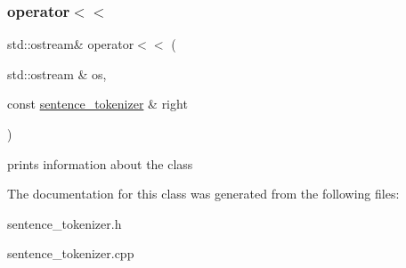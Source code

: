\subsubsection{\texorpdfstring{operator$<$$<$}{operator<<}}
{\footnotesize\ttfamily std\+::ostream\& operator$<$$<$ (\begin{DoxyParamCaption}\item[{std\+::ostream \&}]{os,  }\item[{const \hyperlink{classsentence__tokenizer}{sentence\+\_\+tokenizer} \&}]{right }\end{DoxyParamCaption})\hspace{0.3cm}{\ttfamily [friend]}}

prints information about the class 

The documentation for this class was generated from the following files\+:\begin{DoxyCompactItemize}
\item 
sentence\+\_\+tokenizer.\+h\item 
sentence\+\_\+tokenizer.\+cpp\end{DoxyCompactItemize}
